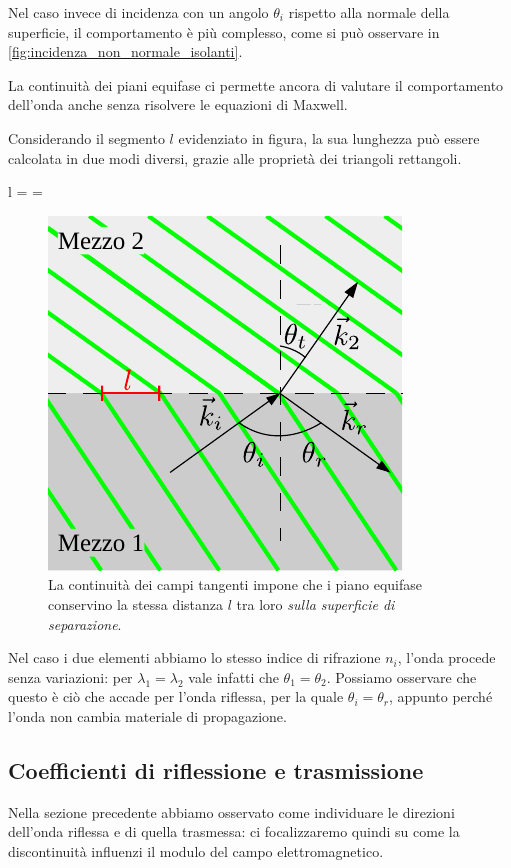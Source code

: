 	Nel caso invece di incidenza con un angolo $\theta_i$ rispetto alla normale della superficie, il comportamento è più complesso, come si può osservare in \autoref{fig:incidenza_non_normale_isolanti}.

	La continuità dei piani equifase ci permette ancora di valutare il comportamento dell'onda anche senza risolvere le equazioni di Maxwell.

	Considerando il segmento $l$ evidenziato in figura, la sua lunghezza può essere calcolata in due modi diversi, grazie alle proprietà dei triangoli rettangoli.

	\begin{esp} \label{eq:legge_di_schnell}
		l =  = 
	\end{esp}

	\begin{figure}[ht]
		\centering
		\includegraphics{img/incidenza_non_normale.pdf}
		\caption{La continuità dei campi tangenti impone che i piano equifase conservino la stessa distanza $l$ tra loro \emph{sulla superficie di separazione}.}
		\label{fig:incidenza_non_normale_isolanti}
	\end{figure}

	Nel caso i due elementi abbiamo lo stesso indice di rifrazione $n_i$, l'onda procede senza variazioni: per $\lambda_1 = \lambda_2$ vale infatti che $\theta_1 = \theta_2$.
	Possiamo osservare che questo è ciò che accade per l'onda riflessa, per la quale $\theta_i = \theta_r$, appunto perché l'onda non cambia materiale di propagazione.

\subsection{Coefficienti di riflessione e trasmissione}
	Nella sezione precedente abbiamo osservato come individuare le direzioni dell'onda riflessa e di quella trasmessa: ci focalizzaremo quindi su come la discontinuità influenzi il modulo del campo elettromagnetico.

